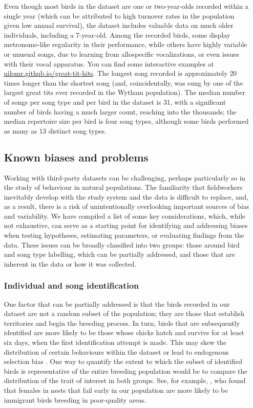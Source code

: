 Even though most birds in the dataset are one or two-year-olds recorded within a single year (which can be attributed to high turnover rates in the population given low annual survival), the dataset includes valuable data on much older individuals, including a 7-year-old. Among the recorded birds, some display metronome-like regularity in their performance, while others have highly variable or unusual songs, due to learning from allospecific vocalizations, or even issues with their vocal apparatus. You can find some interactive examples at \href{https://nilomr.github.io/great-tit-hits/}{nilomr.github.io/great-tit-hits}. The longest song recorded is approximately 20 times longer than the shortest song (and, coincidentally, was sung by one of the largest great tits ever recorded in the Wytham population). The median number of songs per song type and per bird in the dataset is 31, with a significant number of birds having a much larger count, reaching into the thousands; the median repertoire size per bird is four song types, although some birds performed as many as 13 distinct song types.

\subsection{Known biases and problems}

Working with third-party datasets can be challenging, perhaps particularly so in the study of behaviour in natural populations. The familiarity that fieldworkers inevitably develop with the study system and the data is difficult to replace, and, as a result, there is a risk of unintentionally overlooking important sources of bias and variability. We have compiled a list of some key considerations, which, while not exhaustive, can serve as a starting point for identifying and addressing biases when testing hypotheses, estimating parameters, or evaluating findings from the data. These issues can be broadly classified into two groups: those around bird and song type labelling, which can be partially addressed, and those that are inherent in the data or how it was collected.


\subsubsection{Individual and song identification}

One factor that can be partially addressed is that the birds recorded in our dataset are not a random subset of the population; they are those that establish territories and begin the breeding process. In turn, birds that are subsequently identified are more likely to be those whose chicks hatch and survive for at least six days, when the first identification attempt is made. This may skew the distribution of certain behaviours within the dataset or lead to endogenous selection bias \parencite{elwert2014}. One way to quantify the extent to which the subset of identified birds is representative of the entire breeding population would be to compare the distribution of the trait of interest in both groups. See, for example, \cite{kidd2015}, who found that females in nests that fail early in our population are more likely to be immigrant birds breeding in poor-quality areas.

